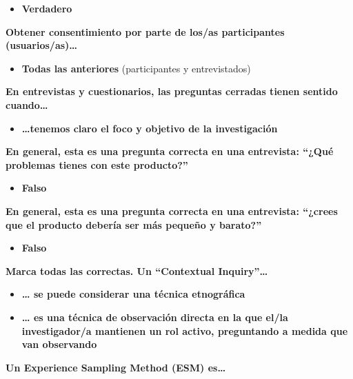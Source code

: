 \documentclass[12pt]{report} %
\begin{document}
\begin{itemize}

\item
  \textbf{Verdadero}
\end{itemize}

\textbf{Obtener consentimiento por parte de los/as participantes
(usuarios/as)\ldots{}}

\begin{itemize}

\item
  \textbf{Todas las anteriores} (participantes y entrevistados)
\end{itemize}

\textbf{En entrevistas y cuestionarios, las preguntas cerradas tienen
sentido cuando\ldots{}}

\begin{itemize}

\item
  \textbf{\ldots tenemos claro el foco y objetivo de la investigación}
\end{itemize}

\textbf{En general, esta es una pregunta correcta en una entrevista:
``¿Qué problemas tienes con este producto?''}

\begin{itemize}

\item
  \textbf{Falso}
\end{itemize}

\textbf{En general, esta es una pregunta correcta en una entrevista:
``¿crees que el producto debería ser más pequeño y barato?''}

\begin{itemize}

\item
  \textbf{Falso}
\end{itemize}

\textbf{Marca todas las correctas. Un ``Contextual Inquiry''\ldots{}}

\begin{itemize}

\item
  \textbf{\ldots{} se puede considerar una técnica etnográfica}
\item
  \textbf{\ldots{} es una técnica de observación directa en la que el/la
  investigador/a mantienen un rol activo, preguntando a medida que van
  observando}
\end{itemize}

\textbf{Un Experience Sampling Method (ESM) es\ldots{}}
\end{document}
